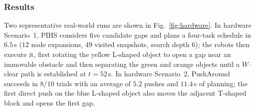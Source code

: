 \subsubsection{Results}\label{subsec:exp-results}
Two representative real-world runs are shown in Fig.~\ref{fig:hardware}.
In hardware Scenario~1, PIHS considers five candidate gaps and plans a four-task schedule in $6.5$\,s ($12$ node expansions, $49$ visited snapshots, search depth $6$); the robots then execute it, first rotating the yellow L-shaped object to open a gap near an
immovable obstacle and then separating the green and orange objects until a $W$--clear path is established at $t=52\,$s.
In hardware Scenario~2, PushAround succeeds in $8/10$ trials with an average of $5.2$
pushes and $11.4$\,s of planning; the first direct push on the blue L-shaped
object also moves the adjacent T-shaped block and opens the first gap.
